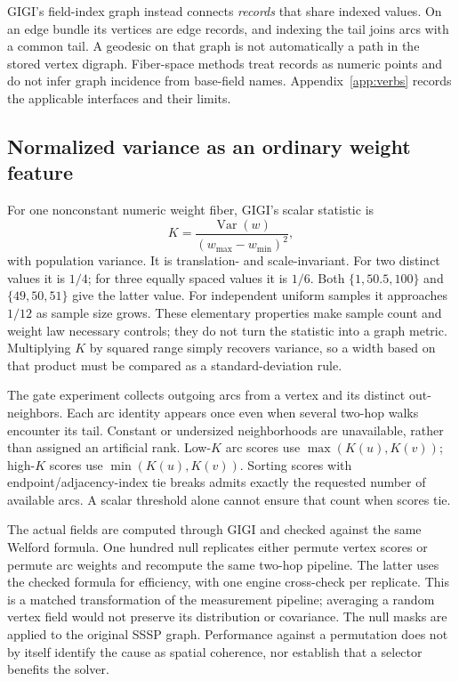 \documentclass[11pt]{article}
\newcommand{\Var}{\operatorname{Var}}
\begin{document}
GIGI's field-index graph instead connects \emph{records} that share indexed
values. On an edge bundle its vertices are edge records, and indexing the tail
joins arcs with a common tail. A geodesic on that graph is not automatically a
path in the stored vertex digraph. Fiber-space methods treat records as numeric
points and do not infer graph incidence from base-field names. Appendix~\ref{app:verbs}
records the applicable interfaces and their limits.

\subsection{Normalized variance as an ordinary weight feature}
For one nonconstant numeric weight fiber, GIGI's scalar statistic is
\[
 K=\frac{\Var(w)}{(w_{\max}-w_{\min})^2},
\]
with population variance. It is translation- and scale-invariant. For two
distinct values it is $1/4$; for three equally spaced values it is $1/6$.
Both $\{1,50.5,100\}$ and $\{49,50,51\}$ give the latter value. For independent
uniform samples it approaches $1/12$ as sample size grows. These elementary
properties make sample count and weight law necessary controls; they do not
turn the statistic into a graph metric. Multiplying $K$ by squared range simply
recovers variance, so a width based on that product must be compared as a
standard-deviation rule.

The gate experiment collects outgoing arcs from a vertex and its distinct
out-neighbors. Each arc identity appears once even when several two-hop walks
encounter its tail. Constant or undersized neighborhoods are unavailable, rather
than assigned an artificial rank. Low-$K$ arc scores use $\max(K(u),K(v))$;
high-$K$ scores use $\min(K(u),K(v))$. Sorting scores with endpoint/adjacency-index
tie breaks admits exactly the requested number of available arcs. A scalar
threshold alone cannot ensure that count when scores tie.

The actual fields are computed through GIGI and checked against the same Welford
formula. One hundred null replicates either permute vertex scores or permute arc
weights and recompute the same two-hop pipeline. The latter uses the checked
formula for efficiency, with one engine cross-check per replicate. This is a
matched transformation of the measurement pipeline; averaging a random vertex
field would not preserve its distribution or covariance. The null masks are
applied to the original SSSP graph. 
Performance against a permutation does not by itself identify the cause as
spatial coherence, nor establish that a selector benefits the solver.
\end{document}

